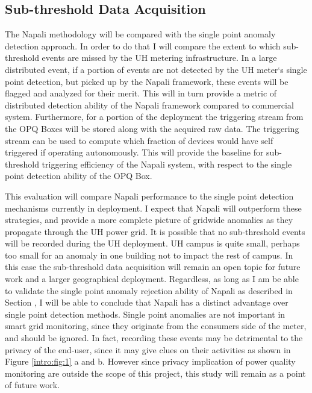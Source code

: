 \subsection{Sub-threshold Data Acquisition} \label{iexp:sec:sub}
The Napali methodology will be compared with the single point anomaly detection approach. In order to do that I will compare the extent to which sub-threshold events are missed by the UH metering infrastructure. In a large distributed event, if a portion of events are not detected by the UH meter`s single point detection, but picked up by the Napali framework, these events will be flagged and analyzed for their merit. This will in turn provide a metric of distributed detection ability of the Napali framework compared to commercial system. Furthermore, for a portion of the deployment the triggering stream from the OPQ Boxes will be stored along with the acquired raw data. The triggering stream can be used to compute which fraction of devices would have self triggered if operating autonomously. This will provide the baseline for sub-threshold triggering efficiency of the Napali system, with respect to the single point detection ability of the OPQ Box.

This evaluation will compare Napali performance to the single point detection mechanisms currently in deployment. I expect that Napali will outperform these strategies, and provide a more complete picture of gridwide anomalies as they propagate through the UH power grid. It is possible that no sub-threshold events will be recorded during the UH deployment. UH campus is quite small, perhaps too small for an anomaly in one building not to impact the rest of campus. In this case the sub-threshold data acquisition will remain an open topic for future work and a larger geographical deployment. Regardless, as long as I am be able to validate the single point anomaly rejection ability of Napali as described in Section \label{iexp:sec:loc}, I will be able to conclude that Napali has a distinct advantage over single point detection methods. Single point anomalies are not important in smart grid monitoring, since they originate from the consumers side of the meter, and should be ignored. In fact, recording these events may be detrimental to the privacy of the end-user, since it may give clues on their activities as shown in Figure \ref{intro:fig:1} a and b. However since privacy implication of power quality monitoring are outside the scope of this project, this study will remain as a point of future work.

